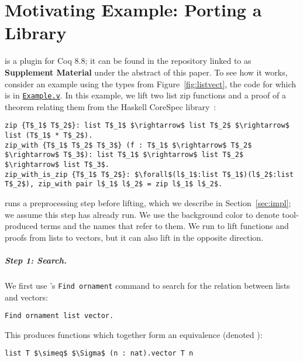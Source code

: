\section{Motivating Example: Porting a Library}
\label{sec:example}

\toolnameb is a plugin for Coq 8.8; it can be found in the repository linked to as \textbf{Supplement Material} under the abstract of this paper.
To see how it works, consider an example using the types from Figure~\ref{fig:listvect},
the code for which is in \href{http://github.com/uwplse/ornamental-search/blob/itp+equiv/plugin/coq/examples/Example.v}{\lstinline{Example.v}}.
In this example, we lift two list zip functions and a proof of a theorem relating them from the Haskell CoreSpec library~\cite{hstocoqv}:
\begin{lstlisting}
zip {T$_1$ T$_2$}: list T$_1$ $\rightarrow$ list T$_2$ $\rightarrow$ list (T$_1$ * T$_2$).
zip_with {T$_1$ T$_2$ T$_3$} (f : T$_1$ $\rightarrow$ T$_2$ $\rightarrow$ T$_3$): list T$_1$ $\rightarrow$ list T$_2$ $\rightarrow$ list T$_3$.
zip_with_is_zip {T$_1$ T$_2$}: $\forall$(l$_1$:list T$_1$)(l$_2$:list T$_2$), zip_with pair l$_1$ l$_2$ = zip l$_1$ l$_2$.
\end{lstlisting}
\toolnameb runs a preprocessing step before lifting, which we describe in Section~\ref{sec:impl}; we assume this step has already run.
We use the  background color to denote tool-produced terms and the names that refer to them.
We run \toolnameb to lift functions and proofs from lists to vectors, but it can also lift in the opposite direction.

\subparagraph*{Step 1: Search.}
We first use \toolnameb's \lstinline{Find ornament} command to search for the relation between lists and vectors:
\begin{lstlisting}
Find ornament list vector.
\end{lstlisting}
This produces functions which together form an equivalence (denoted \smallmath{$\simeq$}):
\begin{lstlisting}
list T $\simeq$ $\Sigma$ (n : nat).vector T n
\end{lstlisting}

